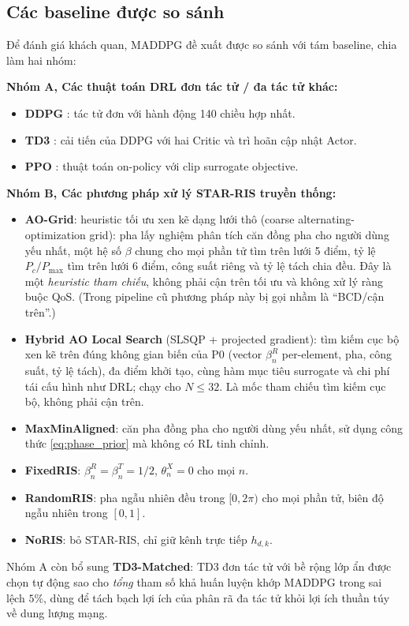 

\subsection{Các baseline được so sánh}

Để đánh giá khách quan, MADDPG đề xuất được so sánh với tám baseline,
chia làm hai nhóm:

\noindent\textbf{Nhóm A, Các thuật toán DRL đơn tác tử / đa tác tử khác:}
\begin{itemize}[leftmargin=*]
\item \textbf{DDPG} \cite{lillicrap2016continuous}: tác tử đơn với hành
động 140 chiều hợp nhất.
\item \textbf{TD3} \cite{fujimoto2018addressing}: cải tiến của DDPG với
hai Critic và trì hoãn cập nhật Actor.
\item \textbf{PPO} \cite{schulman2017proximal}: thuật toán on-policy với
clip surrogate objective.
\end{itemize}

\noindent\textbf{Nhóm B, Các phương pháp xử lý STAR-RIS truyền thống:}
\begin{itemize}[leftmargin=*]
\item \textbf{AO-Grid}: heuristic tối ưu xen kẽ dạng lưới thô
(coarse alternating-optimization grid): pha lấy nghiệm phân tích căn
đồng pha cho người dùng yếu nhất, một hệ số $\beta$ chung cho mọi phần
tử tìm trên lưới 5 điểm, tỷ lệ $P_c/P_{\max}$ tìm trên lưới 6 điểm,
công suất riêng và tỷ lệ tách chia đều. Đây là một \emph{heuristic tham
chiếu}, không phải cận trên tối ưu và không xử lý ràng buộc QoS.
(Trong pipeline cũ phương pháp này bị gọi nhầm là ``BCD/cận trên''.)
\item \textbf{Hybrid AO Local Search} (SLSQP + projected gradient): tìm
kiếm cục bộ xen kẽ trên đúng không gian biến của P0 (vector
$\beta_n^R$ per-element, pha, công suất, tỷ lệ tách), đa điểm khởi
tạo, cùng hàm mục tiêu surrogate và chi phí tái cấu hình như DRL;
chạy cho $N \leq 32$. Là mốc tham chiếu tìm kiếm cục bộ, không phải
cận trên.
\item \textbf{MaxMinAligned}: căn pha đồng pha cho người dùng yếu nhất,
sử dụng công thức \eqref{eq:phase_prior} mà không có RL tinh chỉnh.
\item \textbf{FixedRIS}: $\beta_n^R = \beta_n^T = 1/2$, $\theta_n^X = 0$ cho
mọi $n$.
\item \textbf{RandomRIS}: pha ngẫu nhiên đều trong $[0, 2\pi)$ cho mọi
phần tử, biên độ ngẫu nhiên trong $[0,1]$.
\item \textbf{NoRIS}: bỏ STAR-RIS, chỉ giữ kênh trực tiếp $h_{d,k}$.
\end{itemize}
Nhóm A còn bổ sung \textbf{TD3-Matched}: TD3 đơn tác tử với bề rộng lớp
ẩn được chọn tự động sao cho \emph{tổng} tham số khả huấn luyện khớp
MADDPG trong sai lệch $5\%$, dùng để tách bạch lợi ích của phân rã đa
tác tử khỏi lợi ích thuần túy về dung lượng mạng.

